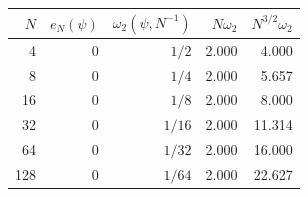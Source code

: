\begin{tabular}{rrrrr}
\toprule
$N$ & $e_N(\psi)$ & $\omega_2(\psi,N^{-1})$ & $N\omega_2$ & $N^{3/2}\omega_2$\\
\midrule
4 & 0 & $1/2$ & 2.000 & 4.000\\
8 & 0 & $1/4$ & 2.000 & 5.657\\
16 & 0 & $1/8$ & 2.000 & 8.000\\
32 & 0 & $1/16$ & 2.000 & 11.314\\
64 & 0 & $1/32$ & 2.000 & 16.000\\
128 & 0 & $1/64$ & 2.000 & 22.627\\
\bottomrule
\end{tabular}
